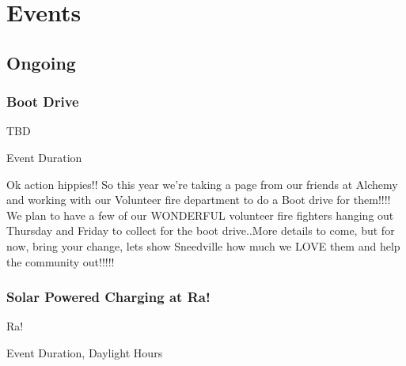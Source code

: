 %
%

\chapter{Events}


\begin{multicols}{2}



\section*{Ongoing}
\subsection*{Boot Drive}
\begin{description}[leftmargin=6em,noitemsep,style=nextline]
  \item[Location:] TBD
  \item[Times:] Event Duration
\end{description}

Ok action hippies!! So this year we're taking a page from our friends at Alchemy and working with our Volunteer fire department to do a Boot drive for them!!!! We plan to have a few of our WONDERFUL volunteer fire fighters hanging out Thursday and Friday to collect for the boot drive..More details to come, but for now, bring your change, lets show Sneedville how much we LOVE them and help the community out!!!!!

\subsection*{Solar Powered Charging at Ra!}
\begin{description}[leftmargin=6em,noitemsep,style=nextline]
	\item[Camp:] Ra!
    \item[Times:] Event Duration, Daylight Hours
\end{description}


\end{multicols}
